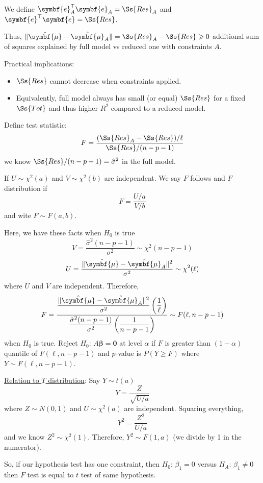 We define $ \symbf{e}_A^\top \symbf{e}_A=\Ss{Res}_A $
and $ \symbf{e}^\top \symbf{e} =\Ss{Res} $.

Thus, $ \norm{\hat{\symbf{\mu}}-\hat{\symbf{\mu}}_A}=
    \Ss{Res}_A-\Ss{Res} \geqslant 0 $
additional sum of squares explained by full model vs reduced
one with constraints $ A $.

Practical implications:
\begin{itemize}
    \item $ \Ss{Res} $ cannot decrease when constraints applied.
    \item Equivalently, full model always has small (or equal)
          $ \Ss{Res} $ for a fixed $ \Ss{Tot} $
          and thus higher $ R^2 $ compared to a reduced model.
\end{itemize}

Define test statistic:
\[ F=\frac{(\Ss{Res}_A-\Ss{Res})/\ell}{\Ss{Res}/(n-p-1)}  \]
we know $ \Ss{Res}/(n-p-1)=\hat{\sigma}^2 $ in the full model.
\begin{Definition}{}{}
    If $ U \sim \chi^2(a) $ and $ V \sim \chi^2(b) $
    are independent. We say $ F $ follows and
    $ F $ distribution if
    \[ F=\frac{U/a}{V/b} \]
    and wite $ F \sim F(a,b) $.
\end{Definition}
Here, we have these facts when $ H_0 $ is true
\[ V=\frac{\hat{\sigma}^2(n-p-1)}{\sigma^2}\sim \chi^2(n-p-1)  \]
\[ U=\frac{\norm{\hat{\symbf{\mu}}-\hat{\symbf{\mu}}_A}^2}{\sigma^2}\sim \chi^2(\ell)  \]
where $ U $ and $ V $ are independent. Therefore,
\[ F=\dfrac{\dfrac{\norm{\hat{\symbf{\mu}}-\hat{\symbf{\mu}}_A}^2}{\sigma^2}
        \left( \dfrac{1}{\ell} \right)}{\dfrac{\hat{\sigma}^2(n-p-1)}{\sigma^2}
        \left( \dfrac{1}{n-p-1} \right)} \sim F(\ell,n-p-1)   \]
when $ H_0 $ is true. Reject
$ H_0 $: $ A\symbf{\beta}=\symbf{0} $ at level $ \alpha $
if $ F $ is greater than $ (1-\alpha) $
quantile of $ F(\ell,n-p-1) $
and $ p $-value is $ P(Y\geqslant F) $ where $ Y \sim F(\ell,n-p-1) $.

\underline{Relation to $ T $ distribution}:
Say $ Y \sim t(a) $
\[ Y=\frac{Z}{\sqrt{U/a}}  \]
where $ Z \sim N(0,1) $ and $ U \sim \chi^2(a) $ are independent.
Squaring everything,
\[ Y^2=\frac{Z^2}{U/a} \]
and we know $ Z^2 \sim \chi^2(1) $. Therefore,
$ Y^2 \sim F(1,a) $ (we divide by 1 in the numerator).

So, if our hypothesis test has one constraint,
then $ H_0 $: $ \beta_1=0 $ versus $ H_A $: $ \beta_1\neq 0 $
then $ F $ test is equal to $ t $ test of same hypothesis.
